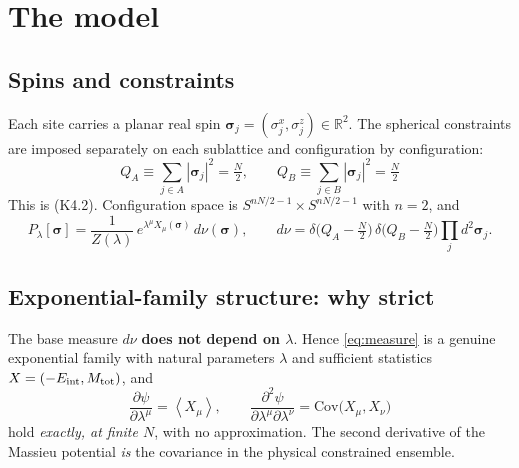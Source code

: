 \documentclass[11pt,a4paper]{article}
\newcommand{\avg}[1]{\left\langle #1 \right\rangle}
\newcommand{\avg}[1]{\left\langle #1 \right\rangle}
\begin{document}
\section{The model}

\subsection{Spins and constraints}
Each site carries a planar real spin $\bm\sigma_j=(\sigma^x_j,\sigma^z_j)\in\mathbb R^2$.
The spherical constraints are imposed separately on each sublattice and configuration by
configuration:
\begin{equation}
  \boxed{\
  Q_A\equiv\sum_{j\in A}|\bm\sigma_j|^2=\tfrac N2,
  \qquad
  Q_B\equiv\sum_{j\in B}|\bm\sigma_j|^2=\tfrac N2 \ }
  \label{eq:constraints}
\end{equation}
This is (K4.2). Configuration space is $S^{nN/2-1}\times S^{nN/2-1}$ with $n=2$, and
\begin{equation}
  P_\lambda[\bm\sigma]=\frac{1}{Z(\lambda)}\,e^{\lambda^\mu X_\mu(\bm\sigma)}\,d\nu(\bm\sigma),
  \qquad
  d\nu=\delta\big(Q_A-\tfrac N2\big)\,\delta\big(Q_B-\tfrac N2\big)\prod_j d^2\bm\sigma_j .
  \label{eq:measure}
\end{equation}

\subsection{Exponential-family structure: why strict}
\label{sec:expfamily}
The base measure $d\nu$ \textbf{does not depend on $\lambda$}. Hence \eqref{eq:measure} is a
genuine exponential family with natural parameters $\lambda$ and sufficient statistics
$X=(-E_{\rm int},M_{\rm tot})$, and
\begin{equation}
  \boxed{\
  \frac{\partial\psi}{\partial\lambda^\mu}=\avg{X_\mu},
  \qquad
  \frac{\partial^2\psi}{\partial\lambda^\mu\partial\lambda^\nu}=\mathrm{Cov}\big(X_\mu,X_\nu\big) \ }
  \label{eq:expfam}
\end{equation}
hold \emph{exactly, at finite $N$}, with no approximation. The second derivative of the
Massieu potential \emph{is} the covariance in the physical constrained ensemble.
\end{document}
